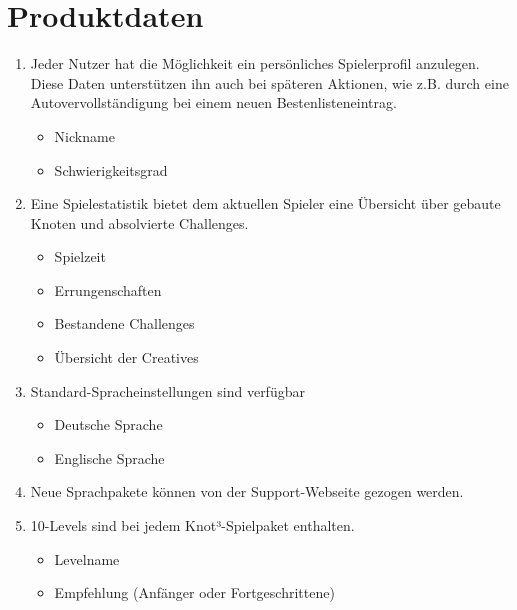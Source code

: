 \chapter{Produktdaten}

\renewcommand{\theenumi}{/PD\_\arabic{enumi}0/}
\renewcommand{\labelenumi}{\theenumi}


\begin{enumerate}

\item Jeder Nutzer hat die Möglichkeit ein persönliches Spielerprofil anzulegen. Diese Daten unterstützen ihn auch bei späteren Aktionen, wie z.B. durch eine Autovervollständigung bei einem neuen Bestenlisteneintrag. 

  \begin{itemize}
     \item Nickname
     \item Schwierigkeitsgrad
  \end{itemize}

\item Eine Spielestatistik bietet dem aktuellen Spieler eine Übersicht über gebaute Knoten und absolvierte Challenges.

  \begin{itemize}
     \item Spielzeit
     \item Errungenschaften
     \item Bestandene Challenges
     \item Übersicht der Creatives
  \end{itemize}

\item Standard-Spracheinstellungen sind verfügbar

  \begin{itemize}
     \item Deutsche Sprache
     \item Englische Sprache
  \end{itemize}
  
\item Neue Sprachpakete können von der Support-Webseite gezogen werden.
\item 10-Levels sind bei jedem Knot³-Spielpaket enthalten.

  \begin{itemize}
     \item Levelname
     \item Empfehlung (Anfänger oder Fortgeschrittene)
  \end{itemize}


\end{enumerate}
